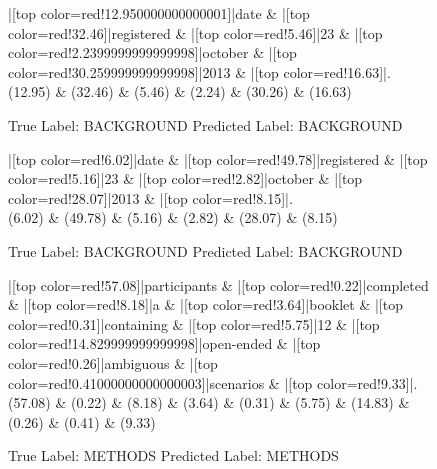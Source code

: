 \documentclass[a4paper, landscape]{article}
\begin{document}
\begin{figure}
\begin{center}
\begin{dependency}
\begin{deptext}
|[top color=red!12.950000000000001]|date \& |[top color=red!32.46]|registered \& |[top color=red!5.46]|23 \& |[top color=red!2.2399999999999998]|october \& |[top color=red!30.259999999999998]|2013 \& |[top color=red!16.63]|.\\
(12.95) \& (32.46) \& (5.46) \& (2.24) \& (30.26) \& (16.63)\\
\end{deptext}
\end{dependency}
\end{center}
\caption{True Label: BACKGROUND Predicted Label: BACKGROUND}
\end{figure}
\clearpage
\begin{figure}
\begin{center}
\begin{dependency}
\begin{deptext}
|[top color=red!6.02]|date \& |[top color=red!49.78]|registered \& |[top color=red!5.16]|23 \& |[top color=red!2.82]|october \& |[top color=red!28.07]|2013 \& |[top color=red!8.15]|.\\
(6.02) \& (49.78) \& (5.16) \& (2.82) \& (28.07) \& (8.15)\\
\end{deptext}
\end{dependency}
\end{center}
\caption{True Label: BACKGROUND Predicted Label: BACKGROUND}
\end{figure}
\clearpage
\begin{figure}
\begin{center}
\begin{dependency}
\begin{deptext}
|[top color=red!57.08]|participants \& |[top color=red!0.22]|completed \& |[top color=red!8.18]|a \& |[top color=red!3.64]|booklet \& |[top color=red!0.31]|containing \& |[top color=red!5.75]|12 \& |[top color=red!14.829999999999998]|open-ended \& |[top color=red!0.26]|ambiguous \& |[top color=red!0.41000000000000003]|scenarios \& |[top color=red!9.33]|.\\
(57.08) \& (0.22) \& (8.18) \& (3.64) \& (0.31) \& (5.75) \& (14.83) \& (0.26) \& (0.41) \& (9.33)\\
\end{deptext}
\end{dependency}
\end{center}
\caption{True Label: METHODS Predicted Label: METHODS}
\end{figure}
\end{document}
